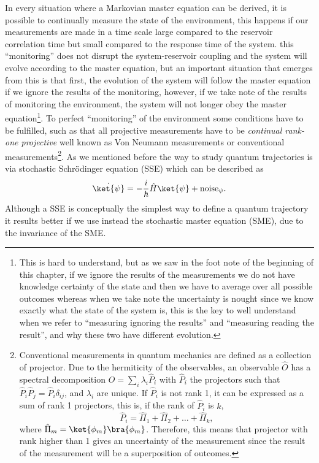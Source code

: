 In every situation where a Markovian master equation can be derived, it is possible to continually measure the state of the environment, this happens if our measurements are made in a time scale large compared to the reservoir correlation time but small compared to the response time of the system.  this ``monitoring'' does not disrupt the system-reservoir coupling and the system will evolve according to the master equation, but an important situation that emerges from this is that first, the evolution of the system will follow the master equation if we ignore the results of the monitoring, however, if we take note of the results of monitoring the environment, the system will not longer obey the master equation\footnote{This is hard to understand, but as we saw in the foot note of the beginning of this chapter, if we ignore the results of the measurements we do not have knowledge certainty of the state and then we have to average over all possible outcomes whereas when we take note the uncertainty is nought since we know exactly what the state of the system is, this is the key to well understand when we refer to ``measuring ignoring the results'' and ``measuring reading the result'', and why these two have different evolution. }. 
To perfect ``monitoring'' of the environment some conditions have to be fulfilled, such as that all projective measurements have to be \textit{continual rank-one projective} well known as Von Neumann measurements or conventional measurements\footnote{Conventional measurements in quantum mechanics are defined as a collection of projector. Due to the  hermiticity of the observables, an observable $\hat{O}$ has a spectral decomposition $\hat{O}=\sum_{i}\lambda_{i}\hat{P}_{i}$ with $\hat{P}_{i}$ the projectors such that $\hat{P}_{i}\hat{P}_{j}=\hat{P}_{i}\delta_{ij}$, and $\lambda_{i}$ are unique. If $\hat{P}_{i}$ is not rank 1, it can be expressed as a sum of rank 1 projectors, this is, if the rank of $\hat{P}_{i}$ is $k$, 
\[\hat{P}_{i} =\hat{\Pi}_{1}+\hat{\Pi}_{2}+\ldots+\hat{\Pi}_{k},\]
where $\hat{\Pi}_{m}=\ket{\phi_{m}}\bra{\phi_{m}}$. Therefore, this means that projector with rank higher than 1 gives an uncertainty of the measurement since the result of the measurement will be a superposition of outcomes\cite{POVM1}\cite{POVM2}.}.
As we mentioned before the way to study quantum trajectories is via stochastic Schr\"odinger equation (SSE) which can be described as
\[\dot{\ket{\psi}}=-\frac{i}{\hbar}\hat{H}\ket{\psi}+ \text{noise}_{\psi}.\]
Although a SSE is conceptually the simplest way to define a quantum trajectory it results better if we use instead the stochastic master equation (SME), due to the invariance of the SME.\\
